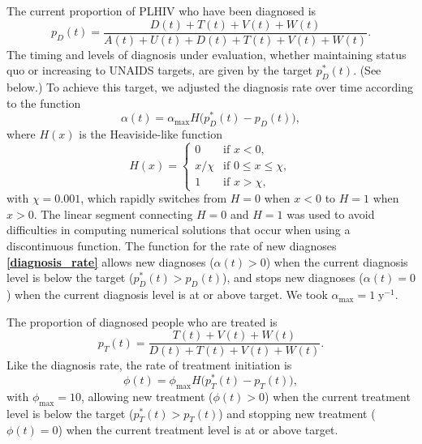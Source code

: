 \documentclass{article}
\renewcommand{\eqref}[1]{\textbf{\ref{#1}}}
\begin{document}
The current proportion of PLHIV who have been diagnosed is
\begin{equation}
  p_D(t) = \frac{D(t) + T(t) + V(t) + W(t)}
  {A(t) + U(t) + D(t) + T(t) + V(t) + W(t)}.
\end{equation}
The timing and levels of diagnosis under evaluation, whether
maintaining status quo or increasing to UNAIDS targets, are given by
the target $p_D^*(t)$.  (See below.)  To achieve this target, we
adjusted the diagnosis rate over time according to the function
\begin{equation}
  \label{diagnosis_rate}
  \alpha(t) = \alpha_{\max} H\big(p_D^*(t) - p_D(t)\big),
\end{equation}
where $H(x)$ is the Heaviside-like function
\begin{equation}
  H(x) =
  \begin{cases}
    0 & \text{if $x < 0$},
    \\
    x / \chi & \text{if $0 \leq x \leq \chi$},
    \\
    1 & \text{if $x > \chi$},
  \end{cases}
\end{equation}
with $\chi = 0.001$, which rapidly switches from $H = 0$ when $x < 0$
to $H = 1$ when $x > 0$.  The linear segment connecting $H = 0$ and
$H = 1$ was used to avoid difficulties in computing numerical
solutions that occur when using a discontinuous function.  The
function for the rate of new diagnoses \eqref{diagnosis_rate} allows
new diagnoses ($\alpha(t) > 0$) when the current diagnosis level is
below the target ($p_D^*(t) > p_D(t)$), and stops new
diagnoses ($\alpha(t) = 0$) when the current diagnosis level is at or
above target.  We took $\alpha_{\max} = 1\;\text{y$^{-1}$}$.

The proportion of diagnosed people who are treated is
\begin{equation}
  p_T(t) = \frac{T(t) + V(t) + W(t)}{D(t) + T(t) + V(t) + W(t)}.
\end{equation}
Like the diagnosis rate, the rate of treatment initiation is
\begin{equation}
  \label{treatment_rate}
  \phi(t) = \phi_{\max} H\big(p_T^*(t) - p_T(t)\big),
\end{equation}
with $\phi_{\max} = 10$, allowing new treatment ($\phi(t) > 0$) when
the current treatment level is below the target ($p_T^*(t) > p_T(t)$)
and stopping new treatment ($\phi(t) = 0$) when the current treatment
level is at or above target.
\end{document}
